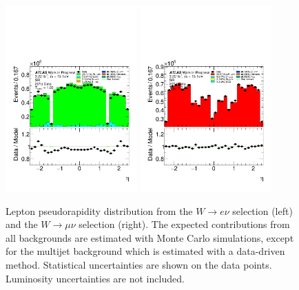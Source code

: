 \begin{figure}[htbp]
\centering
\includegraphics[width=0.45\textwidth]{figures/SR/dataMc-lep_0_eta-SR-bkgQCD-el.pdf}
\includegraphics[width=0.45\textwidth]{figures/SR/dataMc-lep_0_eta-SR-bkgQCD-mu.pdf}
\caption{
Lepton  pseudorapidity distribution from the $W \rightarrow e\nu$ selection (left) and the $W \rightarrow \mu\nu$ selection (right). 
The expected contributions from all backgrounds are estimated with Monte Carlo simulations, except for the multijet background which is estimated with a data-driven method. 
Statistical uncertainties are shown on the data points.
Luminosity uncertainties are not included.
}
\label{fig:SR_lep_0_eta}
\end{figure}


